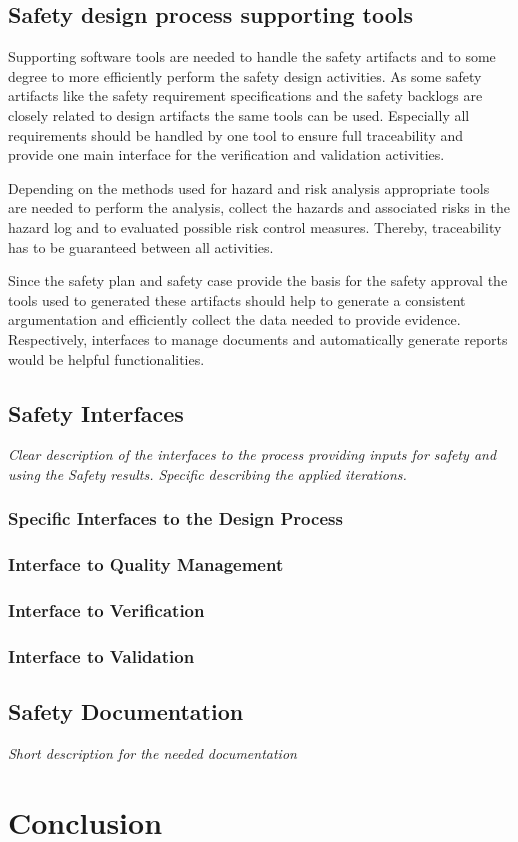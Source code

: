 \documentclass{template/openetcs_report}
\begin{document}
\section{Safety design process supporting tools}

Supporting software tools are needed to handle the safety artifacts and to some degree to more efficiently perform the safety design activities. As some safety artifacts like the safety requirement specifications and the safety backlogs are closely related to design artifacts the same tools can be used. Especially all requirements should be handled by one tool to ensure full traceability and provide one main interface for the verification and validation activities.

Depending on the methods used for hazard and risk analysis appropriate tools are needed to perform the analysis, collect the hazards and associated risks in the hazard log and to evaluated possible risk control measures. Thereby, traceability has to be guaranteed between all activities.

Since the safety plan and safety case provide the basis for the safety approval the tools used to generated these artifacts should help to generate a consistent argumentation and efficiently collect the data needed to provide evidence. Respectively, interfaces to manage documents and automatically generate reports would be helpful functionalities.

\section{Safety Interfaces}

\textit{Clear description of the interfaces to the process providing inputs for safety and using the Safety results. Specific describing the applied iterations.}

\subsection{Specific Interfaces to the Design Process}

\subsection{Interface to Quality Management}

\subsection{Interface to Verification}

\subsection{Interface to Validation}

\section{Safety Documentation}

\textit{Short description for the needed documentation}

 
\chapter{Conclusion}






\end{document}
